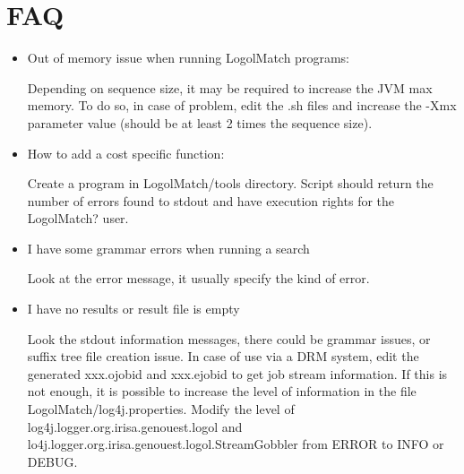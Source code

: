 \documentclass[11pt]{article}
\begin{document}
\section{FAQ}
\begin{itemize}
  \item Out of memory issue when running LogolMatch programs:

 Depending on sequence size, it may be required to increase the JVM max memory. To do so, in case of problem, edit the .sh files and increase the -Xmx parameter value (should be at least 2 times the sequence size).
  \item How to add a cost specific function:

 Create a program in LogolMatch/tools directory. Script should return the number of errors found to stdout and have execution rights for the LogolMatch? user.
  \item I have some grammar errors when running a search

 Look at the error message, it usually specify the kind of error.
  \item I have no results or result file is empty

 Look the stdout information messages, there could be grammar issues, or suffix tree file creation issue.   In case of use via a DRM system, edit the generated xxx.ojobid and xxx.ejobid to get job stream information. If this is not enough, it is possible to increase the level of information in the file LogolMatch/log4j.properties. Modify the level of log4j.logger.org.irisa.genouest.logol and lo4j.logger.org.irisa.genouest.logol.StreamGobbler from ERROR to INFO or DEBUG.
\end{itemize}
\end{document}
